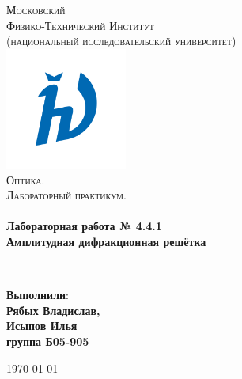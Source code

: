 \documentclass[a4paper,12pt]{article}
\begin{document}
\begin{titlepage}
	\begin{center}
		
		\textsc{\LARGE Московский\\[-0.2cm]Физико-Технический Институт\\[0.1cm]\large (национальный исследовательский университет)}\\[1.5cm] 
		
	\includegraphics[width=0.3\textwidth]{hv_s_no_bg.png}~\\[1cm]

	\textsc{\Large Оптика. \\ Лабораторный практикум. }\\[0.2cm]

	\HRule \\[0.4cm]
	{ \LARGE \bfseries Лабораторная работа № 4.4.1 \\ Амплитудная дифракционная решётка \\[0.4cm] }

	\HRule \\[1.5cm]
		
		\noindent
		\begin{minipage}{0.4\textwidth}
			\begin{flushleft} \large
			\end{flushleft}
		\end{minipage}%
		\begin{minipage}{0.4\textwidth}
			\begin{flushright} \large
			\end{flushright}
		\end{minipage}
		
		
		\large{\begin{flushright}
				\vfill
				\textbf{Выполнили}:\\
				\textbf{Рябых Владислав,\\}
				\textbf{Исыпов Илья\\}
				\textbf{группа Б05-905}
		\end{flushright}}
		
		
		{\large \today}\\
		
		
	\end{center}
\end{titlepage}
\end{document}
